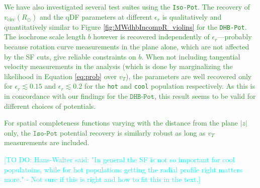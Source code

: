 \documentclass[iop,revtex4]{emulateapj}
\newcommand{\HW}[1]{\textcolor{Cyan}{#1}}
\newcommand{\NEW}[1]{\textcolor{ForestGreen}{#1}}
\newcommand{\OLD}[1]{}
\begin{document}
\NEW{We have also investigated several test suites using the \texttt{Iso-Pot}. The recovery of $v_\text{circ}(R_\odot)$ and the qDF parameters at different $\epsilon_r$ is qualitatively and quantitatively similar to Figure \ref{fig:MWdhbIncompR_violins} for the \texttt{DHB-Pot}. The isochrone scale length $b$ however is recovered independently of $\epsilon_r$---probably because rotation curve measurements in the plane alone, which are not affected by the SF cuts, give reliable constraints on $b$. When not including tangential velocity measurements in the analysis (which is done by marginalizing the likelihood in Equation \eqref{eq:prob} over $v_T$), the parameters are well recovered only for $\epsilon_r \lesssim 0.15$ and $\epsilon_r \lesssim 0.2$ for the \texttt{hot} and \texttt{cool} population respectively. As this is in concordance with our findings for the $\texttt{DHB-Pot}$, this result seems to be valid for different choices of potentials.}

\NEW{For spatial completeness functions varying with the distance from the plane $|z|$ only, the $\texttt{Iso-Pot}$ potential recovery is similarly robust as long as $v_T$ measurements are included.}\OLD{We found similarly robust results also for a misjudgement of spatial completeness functions varying with the distance from the plane, $|z|$.}

\HW{[TO DO: Hans-Walter said: "In general the SF is not so important for cool populatoins, while for hot populations getting the radial profile right matters more." - Not sure if this is right and how to fit this in the text.]}
\end{document}
